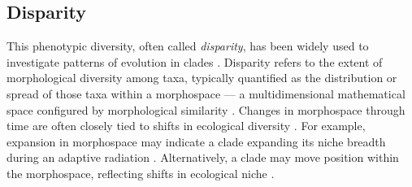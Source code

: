 \documentclass[titlepage]{article}
\begin{document}
\subsection{Disparity}
This phenotypic diversity, often called \textit{disparity}, has been widely used to investigate patterns of evolution in clades \citep{wills_disparity_1994}.
Disparity refers to the extent of morphological diversity among taxa, typically quantified as the distribution or spread of those taxa within a morphospace — a multidimensional mathematical space configured by morphological similarity \citep{erwin_disparity_2007}. 
Changes in morphospace through time are often closely tied to shifts in ecological diversity \citep{lowery2019morphospace,budd2021morphospace}. 
For example, expansion in morphospace may indicate a clade expanding its niche breadth during an adaptive radiation \citep{foote1994morphological,raup1994role,sidlauskas2008continuous}.
Alternatively, a clade may move position within the morphospace, reflecting shifts in ecological niche \citep{hopkins2016magnitude}. 


\end{document}
